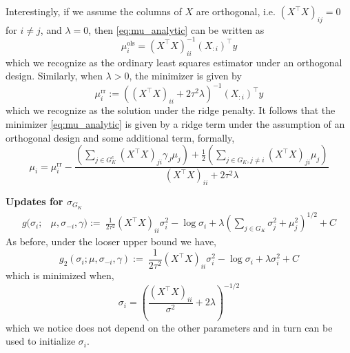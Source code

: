 Interestingly, if we assume the columns of $X$ are orthogonal, i.e. $ (X^\top X)_{ij} = 0$ for $i \neq j$, and $\lambda = 0$, then \eqref{eq:mu_analytic} can be written as
\begin{equation}
    \mu_i^{\text{ols}} = (X^\top X)_{ii}^{-1} (X_{:i})^\top y
\end{equation}
which we recognize as the ordinary least squares estimator under an orthogonal design. Similarly, when $\lambda > 0$, the minimizer is given by
\begin{equation}
    \mu_i^{\text{rr}} := \left((X^\top X)_{ii} + 2\tau^2 \lambda \right)^{-1} (X_{:i})^\top y
\end{equation}
which we recognize as the solution under the ridge penalty. It follows that the minimizer \eqref{eq:mu_analytic} is given by a ridge term under the assumption of an orthogonal design and some additional term, formally,
\begin{equation}
    \mu_i = \mu_i^{\text{rr}} - \frac{
	\left(\sum_{j \in G_K^c} (X^\top X)_{ji} \gamma_{J} \mu_j \right) +
	\frac{1}{2} \left(\sum_{j \in G_K, j\neq i} (X^\top X)_{ji} \mu_j \right)
    }{
	(X^\top X)_{ii} +
	2 \tau^2 \lambda 
    }
\end{equation}

\textbf{Updates for $\sigma_{G_K}$}
\begin{equation}
\begin{aligned}
    g(\sigma_i;& \mu, \sigma_{-i}, \gamma) :=\
    \frac{1}{2\tau^2} (X^\top X)_{ii} \sigma_i^2
-
    \log{\sigma_i}
+
    \lambda \left( \sum_{j \in G_K} 
	\sigma_j^2 + \mu_j^2
    \right)^{1/2} + C
\end{aligned}
\end{equation}
As before, under the looser upper bound we have,
\begin{equation}
    g_2 (\sigma_i; \mu, \sigma_{-i}, \gamma) :=\
    \frac{1}{2\tau^2} (X^\top X)_{ii} \sigma_i^2
-
    \log{\sigma_i}
+
    \lambda \sigma_i^2 + C
\end{equation}
which is minimized when,
\begin{equation}
    \sigma_i = \left( \frac{(X^\top X)_{ii}}{\sigma^2} + 2 \lambda \right)^{-1/2}
\end{equation}
which we notice does not depend on the other parameters and in turn can be used to initialize $\sigma_i$.

